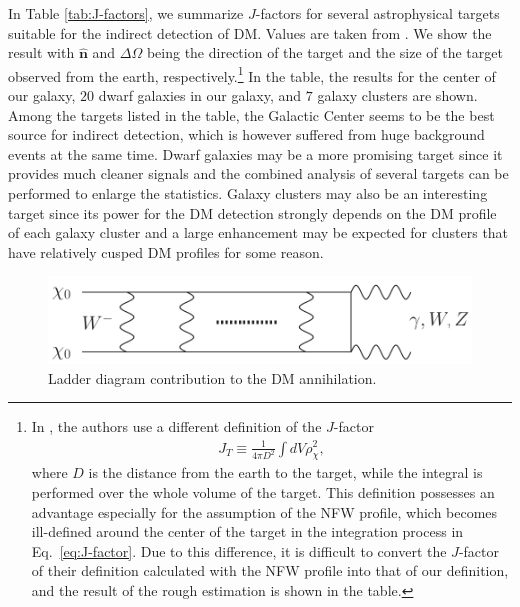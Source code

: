 \documentclass[12pt,twoside,book]{article}
\begin{document}
In Table \ref{tab:J-factors}, we summarize $J$-factors for several astrophysical targets suitable for the indirect detection of DM.
Values are taken from \cite{Fornasa:2013iaa, Geringer-Sameth:2014yza, S_nchez_Conde_2011}.
We show the result with $\hat{\bm{n}}$ and $\Delta\Omega$ being the direction of the target and the size of the target observed from the earth, respectively.\footnote{
  In \cite{S_nchez_Conde_2011}, the authors use a different definition of the $J$-factor
  \begin{align}
    J_T \equiv \frac{1}{4\pi D^2} \int dV \rho_\chi^2,
  \end{align}
  where $D$ is the distance from the earth to the target, while the integral is performed over the whole volume of the target.
  This definition possesses an advantage especially for the assumption of the NFW profile, which becomes ill-defined around the center of the target in the integration process in Eq.~\eqref{eq:J-factor}.
  Due to this difference, it is difficult to convert the $J$-factor of their definition calculated with the NFW profile into that of our definition, and the result of the rough estimation is shown in the table.
}
In the table, the results for the center of our galaxy, $20$ dwarf galaxies in our galaxy, and $7$ galaxy clusters are shown.
Among the targets listed in the table, the Galactic Center seems to be the best source for indirect detection, which is however suffered from huge background events at the same time.
Dwarf galaxies may be a more promising target since it provides much cleaner signals and the combined analysis of several targets can be performed to enlarge the statistics.
Galaxy clusters may also be an interesting target since its power for the DM detection strongly depends on the DM profile of each galaxy cluster and a large enhancement may be expected for clusters that have relatively cusped DM profiles for some reason.

\begin{figure}[t]
  \centering
  \includegraphics[width=0.7\hsize]{Sommerfeld.pdf}
  \caption{Ladder diagram contribution to the DM annihilation.}
  \label{fig:ladder}
\end{figure}
\end{document}
